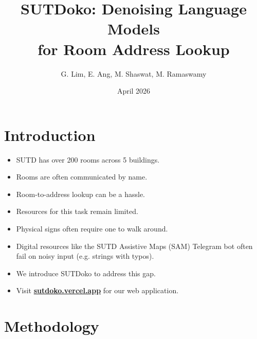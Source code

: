 \documentclass[aspectratio=169,notheorems,10pt]{beamer}
\title{SUTDoko: Denoising Language Models\\for Room Address Lookup}
\author{G. Lim, E. Ang, M. Shaswat, M. Ramaswamy}
\date{April 2026}
\theoremstyle{definition}
\let\oldhref\href
\renewcommand{\href}[2]{\oldhref{#1}{\textbf{#2}}}
\begin{document}
\maketitle

\section{Introduction}
\begin{frame}
\begin{itemize}
	\item SUTD has over 200 rooms across 5 buildings.
	\item Rooms are often communicated by name.
	\item Room-to-address lookup can be a hassle.
\end{itemize}
\end{frame}

\begin{frame}
\begin{itemize}
	\item Resources for this task remain limited.
	\item Physical signs often require one to walk around.
	\item Digital resources like the SUTD Assistive Maps (SAM) Telegram bot \citep{sam} often fail on noisy input (e.g. strings with typos).
\end{itemize}
\end{frame}

\begin{frame}
\begin{itemize}
	\item We introduce SUTDoko to address this gap.
	\item Visit \href{https://sutdoko.vercel.app}{sutdoko.vercel.app} for our web application.
\end{itemize}
\end{frame}

\section{Methodology}
\end{document}
